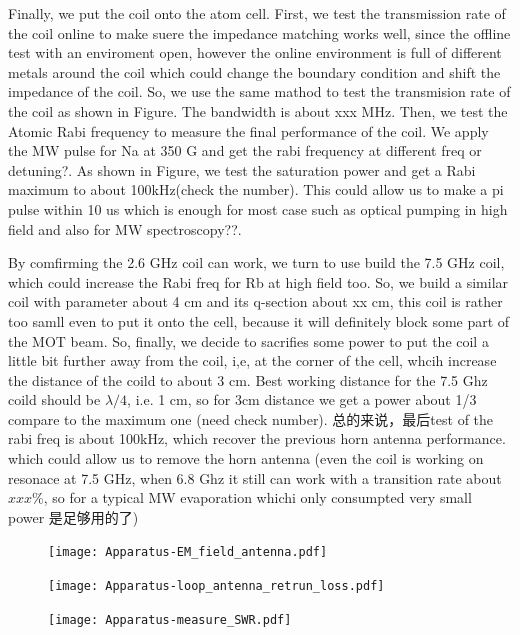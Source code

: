 Finally, we put the coil onto the atom cell. First, we test the transmission rate of the coil online to make suere the impedance matching works well, since the offline test with an enviroment open, however the online environment is full of different metals around the coil which could change the boundary condition and shift the impedance of the coil. So, we use the same mathod to test the transmision rate of the coil as shown in Figure. The bandwidth is about xxx MHz. Then, we test the Atomic Rabi frequency to measure the final performance of the coil. We apply the MW pulse for Na at 350 G and get the rabi frequency at different freq or detuning?. As shown in Figure, we test the saturation power and get a Rabi maximum to about 100kHz(check the number). This could allow us to make a pi pulse within 10 us which is enough for most case such as optical pumping in high field and also for MW spectroscopy??.

By comfirming the 2.6 GHz coil can work, we turn to use build the 7.5 GHz coil, which could increase the Rabi freq for Rb at high field too. So, we build a similar coil with parameter about 4 cm and its q-section about xx cm, this coil is rather too samll even to put it onto the cell, because it will definitely block some part of the MOT beam. So, finally, we decide to sacrifies some power to put the coil a little bit further away from the coil, i,e, at the corner of the cell, whcih increase the distance of the coild to about 3 cm. Best working distance for the 7.5 Ghz coild should be \(\lambda/4\), i.e. 1 cm, so for 3cm distance we get a power about 1/3 compare to the maximum one (need check number). 总的来说，最后test of the rabi freq is about 100kHz, which recover the previous horn antenna performance. which could allow us to remove the horn antenna (even the coil is working on resonace at 7.5 GHz, when 6.8 Ghz it still can work with a transition rate about \(xxx\%\), so for a typical MW evaporation whichi only consumpted very small power 是足够用的了)

\begin{figure}[htb]
\begin{center}
\texttt{[image: Apparatus-EM\_field\_antenna.pdf]}
\end{center}
\caption{}  
\label{antenna_EM}
\end{figure}


\begin{figure}[htb]
\begin{center}
\texttt{[image: Apparatus-loop\_antenna\_retrun\_loss.pdf]}
\end{center}
\caption{}  
\label{antenna_return_loss}
\end{figure}

\begin{figure}[htb]
\begin{center}
\texttt{[image: Apparatus-measure\_SWR.pdf]}
\end{center}
\caption{}
\label{SWR_measure_method}
\end{figure}


